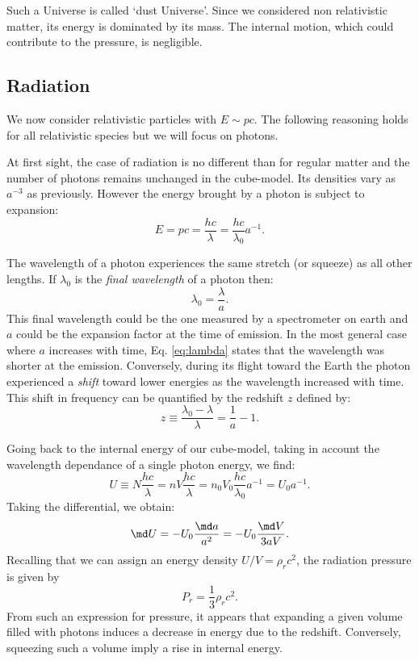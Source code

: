 Such a Universe is called `dust Universe'. Since we considered non relativistic matter, its energy is dominated by its mass. The internal motion, which could contribute to the pressure, is negligible.
\subsection{Radiation} %
\label{sub:radiation}
We now consider relativistic particles with $E\sim pc$. The following reasoning holds for all relativistic species but we will focus on photons.

At first sight, the case of radiation is no different than for regular matter and the number of photons remains unchanged in the cube-model. Its densities vary as $a^{-3}$ as previously. However the energy brought by a photon is subject to expansion:
\begin{equation}
	E=pc=\frac{hc}{\lambda}=\frac{hc}{\lambda_0}a^{-1}.
\end{equation}

The wavelength of a photon experiences the same stretch (or squeeze) as all other lengths. If $\lambda_0$ is the \emph{final wavelength} of a photon then:
\begin{equation}
	\lambda_0=\frac{\lambda}{a}.
	\label{eq:lambda}
\end{equation}
 This final wavelength could be the one measured by a spectrometer on earth and $a$ could be the expansion factor at the time of emission. In the most general case where $a$ increases with time, Eq. \ref{eq:lambda} states that the wavelength was shorter at the emission. Conversely, during its flight toward the Earth the photon experienced a \emph{shift} toward lower energies as the wavelength increased with time. This shift in frequency can be quantified by the redshift $z$ defined by:
\begin{equation}
	z\equiv\frac{\lambda_0-\lambda}{\lambda}=\frac{1}{a}-1.
\end{equation} 

Going back to the internal energy of our cube-model, taking in account the wavelength dependance of a single photon energy, we find:
\begin{equation}
	U\equiv N \frac{hc}{\lambda}=nV\frac{hc}{\lambda}=n_0V_0\frac{hc}{\lambda_0}a^{-1}=U_0a^{-1}.
\end{equation}
Taking the differential, we obtain:
\begin{equation}
	\md U=-U_0\frac{\md a}{a^2}=-U_0\frac{\md V}{3aV}.
\end{equation}
Recalling that we can assign an energy density $U/V=\rho_r c^2$, the radiation pressure is given by 
\begin{equation}
	P_r=\frac{1}{3}\rho_r c^2.
\end{equation}
From such an expression for pressure, it appears that expanding a given volume filled with photons induces a decrease in energy due to the redshift. Conversely, squeezing such a volume imply a rise in internal energy.

